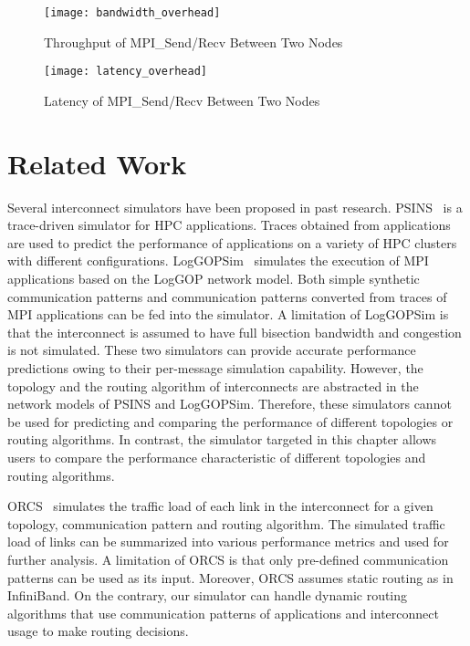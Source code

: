 \begin{figure}
    \centering
    \texttt{[image: bandwidth\_overhead]}
    \caption{Throughput of MPI\_Send/Recv Between Two Nodes}%
    \label{fig:bandwidth-overhead}
\end{figure}

\begin{figure}
    \centering
    \texttt{[image: latency\_overhead]}
    \caption{Latency of MPI\_Send/Recv Between Two Nodes}%
    \label{fig:latency-overhead}
\end{figure}

\section{Related Work}\label{sec:ii-related-work}

Several interconnect simulators have been proposed in past research.
PSINS~\autocite{Tikir2009} is a trace-driven simulator for HPC
applications. Traces obtained from applications are used to predict the
performance of applications on a variety of HPC clusters with different
configurations. LogGOPSim~\autocite{Hoefler2010} simulates the execution
of MPI applications based on the LogGOP network model. Both simple
synthetic communication patterns and communication patterns converted
from traces of MPI applications can be fed into the simulator. A
limitation of LogGOPSim is that the interconnect is assumed to have full
bisection bandwidth and congestion is not simulated. These two
simulators can provide accurate performance predictions owing to their
per-message simulation capability. However, the topology and the routing
algorithm of interconnects are abstracted in the network models of PSINS
and LogGOPSim. Therefore, these simulators cannot be used for predicting
and comparing the performance of different topologies or routing
algorithms. In contrast, the simulator targeted in this chapter allows
users to compare the performance characteristic of different topologies
and routing algorithms.

ORCS~\autocite{Schneider2009} simulates the traffic load of each link in
the interconnect for a given topology, communication pattern and routing
algorithm. The simulated traffic load of links can be summarized into
various performance metrics and used for further analysis. A limitation
of ORCS is that only pre-defined communication patterns can be used as
its input. Moreover, ORCS assumes static routing as in InfiniBand. On
the contrary, our simulator can handle dynamic routing algorithms that
use communication patterns of applications and interconnect usage to
make routing decisions.

